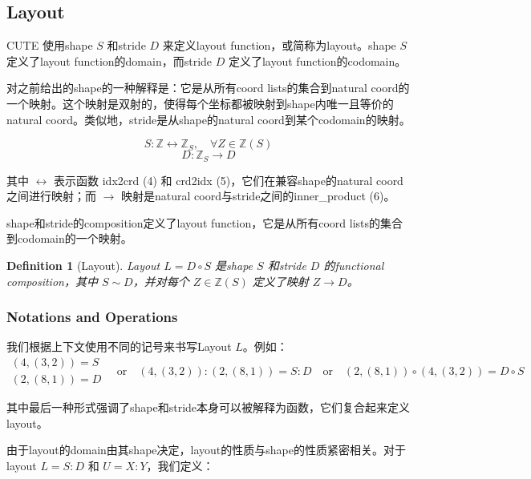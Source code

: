 \documentclass{article}
\newtheorem{definition}{Definition}[section]
\begin{document}
\subsection{Layout}

CUTE 使用shape \( S \) 和stride \( D \) 来定义layout function，或简称为layout。shape \( S \) 定义了layout function的domain，而stride \( D \) 定义了layout function的codomain。

对之前给出的shape的一种解释是：它是从所有coord lists的集合到natural coord的一个映射。这个映射是双射的，使得每个坐标都被映射到shape内唯一且等价的natural coord。类似地，stride是从shape的natural coord到某个codomain的映射。

\[
S : \mathbb{Z} \leftrightarrow \mathbb{Z}_S, \quad \forall Z \in \mathbb{Z}(S)
\]
\[
D : \mathbb{Z}_S \to D
\]

其中 \( \leftrightarrow \) 表示函数 idx2crd (4) 和 crd2idx (5)，它们在兼容shape的natural coord之间进行映射；而 \( \to \) 映射是natural coord与stride之间的inner\_product (6)。

shape和stride的composition定义了layout function，它是从所有coord lists的集合到codomain的一个映射。

\begin{definition}[Layout]
Layout \( L = D \circ S \) 是shape \( S \) 和stride \( D \) 的functional composition，其中 \( S \sim D \)，并对每个 \( Z \in \mathbb{Z}(S) \) 定义了映射 \( Z \to D \)。
\end{definition}

\subsubsection{Notations and Operations}

我们根据上下文使用不同的记号来书写Layout \( L \)。例如：
\[
\begin{array}{l}
(4,(3,2)) = S\\
(2,(8,1)) = D
\end{array}
\quad \text{or} \quad
(4,(3,2)) : (2,(8,1)) = S : D
\quad \text{or} \quad
(2,(8,1)) \circ (4,(3,2)) = D \circ S
\]

其中最后一种形式强调了shape和stride本身可以被解释为函数，它们复合起来定义layout。

由于layout的domain由其shape决定，layout的性质与shape的性质紧密相关。对于layout \( L = S : D \) 和 \( U = X : Y \)，我们定义：
\end{document}
